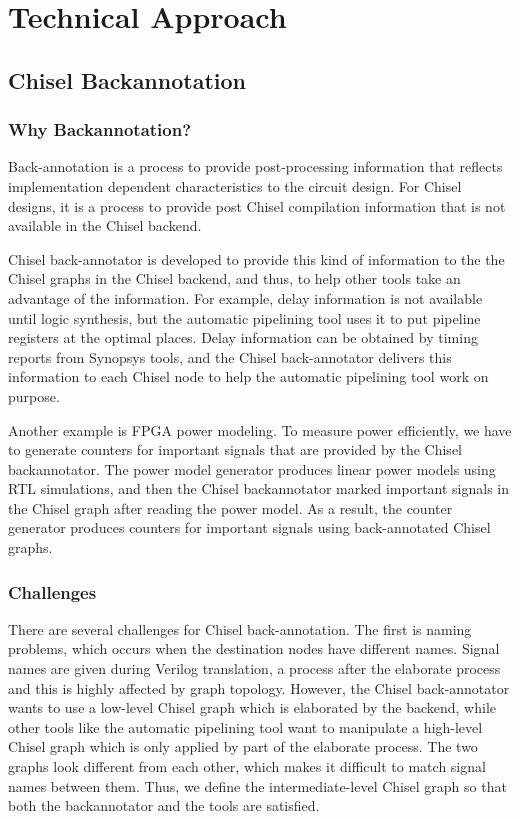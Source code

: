 \section{Technical Approach}
\subsection{Chisel Backannotation}
\subsubsection{Why Backannotation?}
Back-annotation is a process to provide post-processing information that reflects implementation dependent characteristics to the circuit design. For Chisel designs, it is a process to provide post Chisel compilation information that is not available in the Chisel backend. 

Chisel back-annotator is developed to provide this kind of information to the the Chisel graphs in the Chisel backend, and thus, to help other tools take an advantage of the information. For example, delay information is not available until logic synthesis, but the automatic pipelining tool uses it to put pipeline registers at the optimal places. Delay information can be obtained by timing reports from Synopsys tools, and the Chisel back-annotator delivers this information to each Chisel node to help the automatic pipelining tool work on purpose. 

Another example is FPGA power modeling. To measure power efficiently, we have to generate counters for important signals that are provided by the Chisel backannotator. The power model generator produces linear power models using RTL simulations, and then the Chisel backannotator marked important signals in the Chisel graph after reading the power model. As a result, the counter generator produces counters for important signals using back-annotated Chisel graphs.

\subsubsection{Challenges}
There are several challenges for Chisel back-annotation. The first is naming problems, which occurs when the destination nodes have different names. Signal names are given during Verilog translation, a process after the elaborate process and this is highly affected by graph topology. However, the Chisel back-annotator wants to use a low-level Chisel graph which is elaborated by the backend, while other tools like the automatic pipelining tool want to manipulate a high-level Chisel graph which is only applied by part of the elaborate process. The two graphs look different from each other, which makes it difficult to match signal names between them. Thus, we define the intermediate-level Chisel graph so that both the backannotator and the tools are satisfied.


